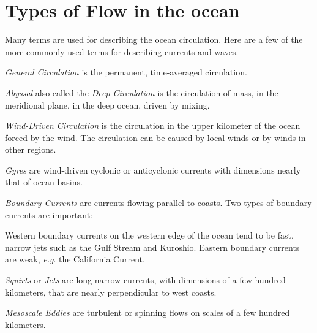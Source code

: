 \section{Types of Flow in the ocean}
Many terms are used for describing the ocean
circulation. Here are a few of the more commonly used terms for
describing currents and waves.
\begin{enumerate}

\vitem\textit{General Circulation} is
the permanent, time-averaged circulation.

\vitem\textit{Abyssal} also called the
\textit{Deep Circulation} is
the circulation of mass, in the meridional plane, in the deep ocean, driven by mixing.

\vitem\textit{Wind-Driven Circulation} is the
circulation in the upper kilometer of the ocean forced by the wind. The circulation
can be caused by local winds or by winds in other regions. 

\vitem\textit{Gyres} are wind-driven cyclonic or anticyclonic currents with
dimensions nearly that of ocean basins.

\vitem\textit{Boundary Currents} are currents
flowing parallel to coasts. Two types of boundary currents are important:
\begin{itemize}
\vitem Western boundary currents on the western edge of the ocean tend to be
fast, narrow jets such as the Gulf Stream and
Kuroshio.
\vitem Eastern boundary currents are weak, \textit{e.g}. the California
Current.
\end{itemize}

\vitem\textit{Squirts} or \textit{Jets}
are long narrow currents, with dimensions of a few hundred
kilometers, that are nearly perpendicular to west coasts. 

\vitem\textit{Mesoscale
Eddies}
are turbulent or spinning flows on scales of a few
hundred kilometers.
\end{enumerate}
\vspace{-0.5ex}


